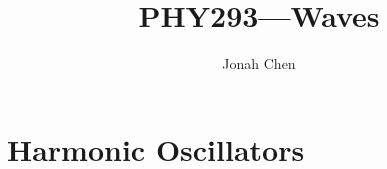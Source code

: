 \documentclass[a4paper]{article}
\title{PHY293---Waves}
\author{Jonah Chen}
\numberwithin{equation}{section}
\begin{document}
\maketitle
\tableofcontents
\section{Harmonic Oscillators}
\end{document}

